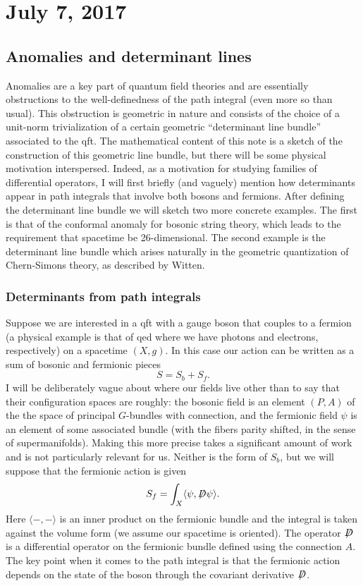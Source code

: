 \documentclass{amsart}
\newcommand{\fsl}[1]{{\centernot{#1}}}
\begin{document}
\section{July 7, 2017}

\subsection{Anomalies and determinant lines}

Anomalies are a key part of quantum field theories and are essentially obstructions to the
well-definedness of the path integral (even more so than usual). This obstruction is geometric
in nature and consists of the choice of a unit-norm trivialization of a certain geometric
``determinant line bundle'' associated to the qft.
The mathematical content of this note is a sketch of the construction of this
geometric line bundle, but there will be some physical motivation interspersed.
Indeed, as a motivation for studying families of differential operators, I will first
briefly (and vaguely) mention how determinants appear in path integrals
that involve both bosons and fermions. After defining the determinant line bundle
we will sketch two more concrete examples.
The first is that of the conformal anomaly for bosonic
string theory, which leads to the requirement that spacetime be 26-dimensional.
The second example is the determinant line bundle which arises naturally in the geometric
quantization of Chern-Simons theory, as described by Witten.

\subsubsection{Determinants from path integrals}

Suppose we are interested in a qft with a gauge boson that couples to a fermion (a physical
example is that of qed where we have photons and electrons, respectively) on a spacetime $(X,g)$.
In this case our action can be written as a sum of bosonic and fermionic pieces
\begin{equation*}
    S = S_b + S_f.
\end{equation*}
I will be deliberately vague about where our fields live other than to say that their
configuration spaces are roughly: the bosonic field is an element $(P,A)$ of the the space of
principal $G$-bundles with connection, and the fermionic field $\psi$ is an element of some
associated bundle (with the fibers parity shifted, in the sense of supermanifolds). 
Making this more precise takes a significant amount of work and is not particularly relevant
for us. Neither is the form of $S_b$, but we will suppose that the fermionic action is given
\begin{equation*}
    S_f = \int_X \langle \psi, \fsl D \psi\rangle.
\end{equation*}
Here $\langle-,-\rangle$ is an inner product on the fermionic bundle and the integral
is taken against the volume form (we assume our spacetime is oriented). The operator
$\fsl D$ is a differential operator on the fermionic bundle defined using the connection
$A$. The key point when it comes to the path integral is that the fermionic action
depends on the state of the boson through the covariant derivative $\fsl D$.
\end{document}
